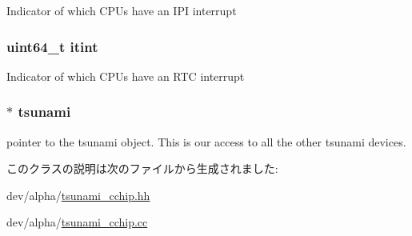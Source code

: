 \label{classTsunamiCChip_aa814845b1fc114b393e125f86d7dc57e}
Indicator of which CPUs have an IPI interrupt \hypertarget{classTsunamiCChip_ad115b62dbebcd51ee67d3110a1b143c6}{
\subsubsection[{itint}]{\setlength{\rightskip}{0pt plus 5cm}uint64\_\-t {\bf itint}}}
\label{classTsunamiCChip_ad115b62dbebcd51ee67d3110a1b143c6}
Indicator of which CPUs have an RTC interrupt \hypertarget{classTsunamiCChip_aa178467f241f875a068722413f62ec20}{
\subsubsection[{tsunami}]{$\ast$ {\bf tsunami}}}
\label{classTsunamiCChip_aa178467f241f875a068722413f62ec20}
pointer to the tsunami object. This is our access to all the other tsunami devices. 

このクラスの説明は次のファイルから生成されました:\begin{DoxyCompactItemize}
\item 
dev/alpha/\hyperlink{tsunami__cchip_8hh}{tsunami\_\-cchip.hh}\item 
dev/alpha/\hyperlink{tsunami__cchip_8cc}{tsunami\_\-cchip.cc}\end{DoxyCompactItemize}
